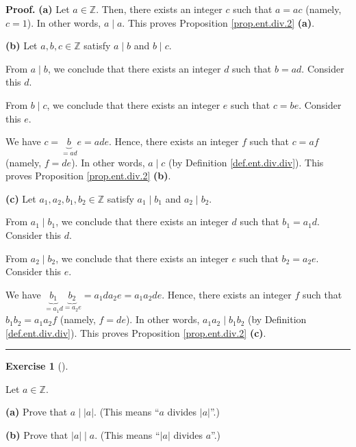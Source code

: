 \documentclass[numbers=enddot,12pt,final,onecolumn,notitlepage]{scrartcl}%
\newcounter{exer}
\numberwithin{exer}{subsection}
\theoremstyle{definition}
\newtheorem{exmp}[exer]{Exercise}
\newenvironment{exercise}[1][]
{\begin{exmp}[#1]\begin{leftbar}}
{\end{leftbar}\end{exmp}}
\newenvironment{proof}[1][Proof]{\noindent\textbf{#1.} }{\ \rule{0.5em}{0.5em}}
\begin{document}
\begin{proof}
\textbf{(a)} Let $a\in\mathbb{Z}$. Then, there exists an integer $c$ such that
$a=ac$ (namely, $c=1$). In other words, $a\mid a$. This proves Proposition
\ref{prop.ent.div.2} \textbf{(a)}.

\textbf{(b)} Let $a,b,c\in\mathbb{Z}$ satisfy $a\mid b$ and $b\mid c$.

From $a\mid b$, we conclude that there exists an integer $d$ such that $b=ad$.
Consider this $d$.

From $b\mid c$, we conclude that there exists an integer $e$ such that $c=be$.
Consider this $e$.

We have $c=\underbrace{b}_{=ad}e=ade$. Hence, there exists an integer $f$ such
that $c=af$ (namely, $f=de$). In other words, $a\mid c$ (by Definition
\ref{def.ent.div.div}). This proves Proposition \ref{prop.ent.div.2}
\textbf{(b)}.

\textbf{(c)} Let $a_{1},a_{2},b_{1},b_{2}\in\mathbb{Z}$ satisfy $a_{1}\mid
b_{1}$ and $a_{2}\mid b_{2}$.

From $a_{1}\mid b_{1}$, we conclude that there exists an integer $d$ such that
$b_{1}=a_{1}d$. Consider this $d$.

From $a_{2}\mid b_{2}$, we conclude that there exists an integer $e$ such that
$b_{2}=a_{2}e$. Consider this $e$.

We have $\underbrace{b_{1}}_{=a_{1}d}\underbrace{b_{2}}_{=a_{2}e}=a_{1}%
da_{2}e=a_{1}a_{2}de$. Hence, there exists an integer $f$ such that
$b_{1}b_{2}=a_{1}a_{2}f$ (namely, $f=de$). In other words, $a_{1}a_{2}\mid
b_{1}b_{2}$ (by Definition \ref{def.ent.div.div}). This proves Proposition
\ref{prop.ent.div.2} \textbf{(c)}.
\end{proof}

\begin{exercise}
\label{exe.ent.div.aabs}Let $a\in\mathbb{Z}$.

\textbf{(a)} Prove that $a\mid\left\vert a\right\vert $. (This means
\textquotedblleft$a$ divides $\left\vert a\right\vert $\textquotedblright.)

\textbf{(b)} Prove that $\left\vert a\right\vert \mid a$. (This means
\textquotedblleft$\left\vert a\right\vert $ divides $a$\textquotedblright.)
\end{exercise}
\end{document}
